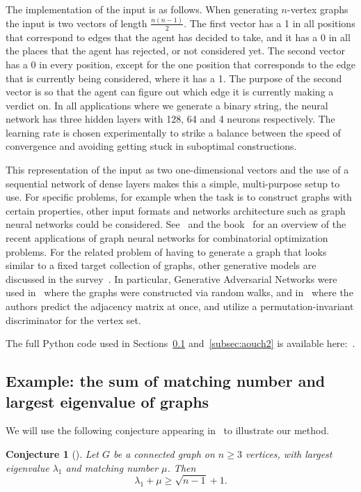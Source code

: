 \documentclass[11pt,english]{article}
\theoremstyle{plain}
\newtheorem{conjecture}[theorem]{Conjecture}
\theoremstyle{remark}
\begin{document}
The implementation of the input is as follows. When generating $n$-vertex graphs the input is two vectors of length $\frac{n(n-1)}{2}$. The first vector has a 1 in all positions that correspond to edges that the agent has decided to take, and it has a 0 in all the places that the agent has rejected, or not considered yet. The second vector has a 0 in every position, except for the one position that corresponds to the edge that is currently being considered, where it has a 1. The purpose of the second vector is so that the agent can figure out which edge it is currently making a verdict on. In all applications where we generate a binary string, the neural network has three hidden layers with 128, 64 and 4 neurons respectively. The learning rate is chosen experimentally to strike a balance between the speed of convergence and avoiding getting stuck in suboptimal constructions.

This representation of the input as two one-dimensional vectors and the use of a sequential network of dense layers makes this a simple, multi-purpose setup to use. For specific problems, for example when the task is to construct graphs with certain properties, other input formats and networks architecture such as graph neural networks could be considered. See~\cite{deepmind} and the book~\cite{gnnbook} for an overview of the recent applications of graph neural networks for combinatorial optimization problems.
For the related problem of having to generate a graph that looks similar to a fixed target collection of graphs, other generative models are discussed in the survey~\cite{graphgensurvey}. In particular, Generative Adversarial Networks were used in~\cite{gan1} where the graphs were constructed via random walks, and in~\cite{gan2} where the authors predict the adjacency matrix at once, and utilize a permutation-invariant discriminator for the vertex set.

The full Python code used in Sections~\ref{subsec:matchingeigen} and~\ref{subsec:aouch2} is available here:~\cite{code}.


\subsection{Example: the sum of matching number and largest eigenvalue of graphs}\label{subsec:matchingeigen}

We will use the following conjecture appearing in~\cite{aouch} to illustrate our method. 

\begin{conjecture}[\cite{aouch}\label{conj:aouch}]
Let $G$ be a connected graph on $n\geq 3$ vertices, with largest eigenvalue $\lambda_1$ and matching number $\mu$. Then
$$\lambda_1+\mu \geq \sqrt{n-1} +1.$$
\end{conjecture}
\end{document}
